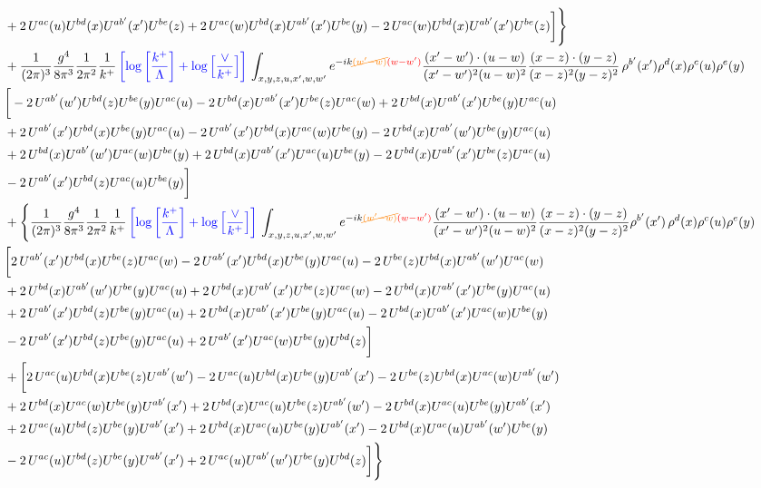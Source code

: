 \documentclass[aps,prd,amsmath,amssymb,nofootinbib]{revtex4-2}
\numberwithin{equation}{section}
\begin{document}
\begin{align}
    & +2\, U^{ac}(u)U^{bd}(x)U^{ab'}(x')U^{be}(z) + 2\,U^{ac}(w)U^{bd}(x)U^{ab'}(x')U^{be}(y)- 2\,U^{ac}(w)U^{bd}(x)U^{ab'}(x')U^{be}(z)\bigg]\Bigg\}\notag \\ & + \frac{1}{(2\pi)^{3}}\frac{g^{4}}{8\pi^{3}}\frac{1}{2\pi^{2}} \frac{1}{k^{+}}\,{\color{blue}\left[\log{\left[\frac{k^{+}}{\Lambda}\right]}+\log{\left[\frac{\vee}{k^{+}}\right]}\right]}\,\int_{x,y,z,u,x^{\prime},w,w^{\prime}}e^{-ik{\color{orange}\cancel{(w^{\prime}-w)}}{\color{red}(w-w^{\prime})}}\frac{(x^{\prime}-w^{\prime})\cdot (u-w)}{(x^{\prime}-w^{\prime})^{2} (u-w)^{2}} \frac{(x-z)\cdot (y-z)}{(x-z)^{2}(y-z)^{2}}\,\rho^{b'}(x^{\prime})\rho^{d}(x)\rho^{c}(u)\rho^{e}(y)\notag \\ & \bigg[-2\,U^{ab'}(w')U^{bd}(z)U^{be}(y)U^{ac}(u) - 2\,U^{bd}(x)U^{ab'}(x^{\prime})U^{be}(z)U^{ac}(w)+ 2\,U^{bd}(x)U^{ab'}(x')U^{be}(y)U^{ac}(u)\notag \\ & + 2\, U^{ab'}(x')U^{bd}(x)U^{be}(y)U^{ac}(u) - 2\,U^{ab'}(x')U^{bd}(x)U^{ac}(w)U^{be}(y) - 2\,U^{bd}(x)U^{ab'}(w')U^{be}(y)U^{ac}(u)\notag \\ &  + 2\, U^{bd}(x)U^{ab'}(w')U^{ac}(w)U^{be}(y) +2\, U^{bd}(x)U^{ab'}(x')U^{ac}(u)U^{be}(y) - 2\,U^{bd}(x)U^{ab'}(x')U^{be}(z)U^{ac}(u)\notag \\ &  - 2\, U^{ab'}(x')U^{bd}(z)U^{ac}(u)U^{be}(y)\bigg]\notag \\ & + \Bigg\{\frac{1}{(2\pi)^{3}}\frac{g^{4}}{8\pi^{3}}\frac{1}{2\pi^{2}} \frac{1}{k^{+}}\,{\color{blue}\left[\log{\left[\frac{k^{+}}{\Lambda}\right]}+\log{\left[\frac{\vee}{k^{+}}\right]}\right]}\,\int_{x,y,z,u,x^{\prime},w,w^{\prime}}e^{-ik{\color{orange}\cancel{(w^{\prime}-w)}}{\color{red}(w-w^{\prime})}}\frac{(x^{\prime}-w^{\prime})\cdot (u-w)}{(x^{\prime}-w^{\prime})^{2} (u-w)^{2}} \frac{(x-z)\cdot (y-z)}{(x-z)^{2}(y-z)^{2}}\rho^{b'}(x^{\prime})\,\rho^{d}(x)\rho^{c}(u)\rho^{e}(y)\notag \\ & \bigg[2\,U^{ab'}(x')U^{bd}(x)U^{be}(z)U^{ac}(w)-2\,U^{ab'}(x')U^{bd}(x)U^{be}(y)U^{ac}(u)-2\,U^{be}(z)U^{bd}(x)U^{ab'}(w')U^{ac}(w)\notag \\ &+2\,U^{bd}(x)U^{ab'}(w')U^{be}(y)U^{ac}(u) +2\,U^{bd}(x)U^{ab'}(x')U^{be}(z)U^{ac}(w) - 2\,U^{bd}(x)U^{ab'}(x')U^{be}(y)U^{ac}(u)\notag \\ & +2\,U^{ab'}(x')U^{bd}(z)U^{be}(y)U^{ac}(u)+2\,U^{bd}(x)U^{ab'}(x')U^{be}(y)U^{ac}(u) -2\, U^{bd}(x)U^{ab'}(x')U^{ac}(w)U^{be}(y)\notag \\ & -2\,  U^{ab'}(x')U^{bd}(z)U^{be}(y)U^{ac}(u) + 2\, U^{ab'}(x')U^{ac}(w)U^{be}(y)U^{bd}(z)\bigg]\notag \\ & +\bigg[2\,U^{ac}(u)U^{bd}(x)U^{be}(z)U^{ab'}(w') -2\,U^{ac}(u)U^{bd}(x)U^{be}(y)U^{ab'}(x')-2\,U^{be}(z)U^{bd}(x)U^{ac}(w)U^{ab'}(w')\notag \\ & +2\,U^{bd}(x)U^{ac}(w)U^{be}(y)U^{ab'}(x') +2\,U^{bd}(x)U^{ac}(u)U^{be}(z)U^{ab'}(w') -2\,U^{bd}(x)U^{ac}(u)U^{be}(y)U^{ab'}(x')\notag \\  & + 2\,U^{ac}(u)U^{bd}(z)U^{be}(y)U^{ab'}(x')+ 2\,U^{bd}(x)U^{ac}(u)U^{be}(y)U^{ab'}(x') -2\, U^{bd}(x)U^{ac}(u)U^{ab'}(w')U^{be}(y)\notag \\ & 
     -2\, U^{ac}(u)U^{bd}(z)U^{be}(y)U^{ab'}(x')+2\, U^{ac}(u)U^{ab'}(w')U^{be}(y)U^{bd}(z)\bigg]\Bigg\}
\end{align}
\end{document}
